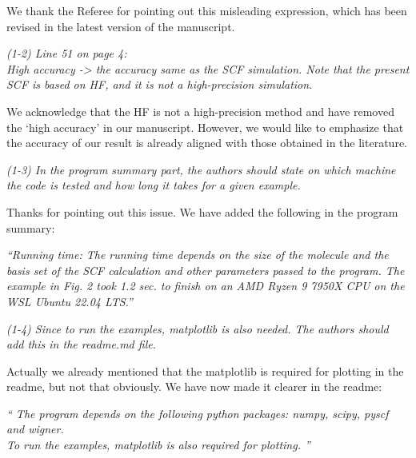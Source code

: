 \documentclass[a4paper,11pt]{article}
\begin{document}
\vspace{1em}

We thank the Referee for pointing out this misleading expression, which has been revised in the latest version of the manuscript.

\vspace{2em}


\noindent\textit{
(1-2) Line 51 on page 4: \\
High accuracy -> the accuracy same as the SCF simulation.
Note that the present SCF is based on HF, and it is not a high-precision simulation.
}

\vspace{1em}

We acknowledge that the HF is not a high-precision method and have removed the `high accuracy' in our manuscript.
However, we would like to emphasize that the accuracy of our result is already aligned with those obtained in the literature.

\vspace{2em}


\noindent\textit{
(1-3) In the program summary part, the authors should state on which machine the code is tested and how long it takes for a given example.
}

\vspace{1em}

Thanks for pointing out this issue.
We have added the following in the program summary:

{\em ``Running time: The running time depends on the size of the molecule and the basis set of the SCF calculation and other parameters passed to the program. The example in Fig. 2 took 1.2 sec. to finish on an AMD Ryzen 9 7950X CPU on the WSL Ubuntu 22.04 LTS.''}

\vspace{2em}


\noindent\textit{
(1-4) Since to run the examples, matplotlib is also needed. The authors should add this in the readme.md file.
}

\vspace{1em}

Actually we already mentioned that the matplotlib is required for plotting in the readme, but not that obviously.
We have now made it clearer in the readme:

{\em ``
The program depends on the following python packages: numpy, scipy, pyscf and wigner. \\
To run the examples, matplotlib is also required for plotting.
''}
\end{document}
